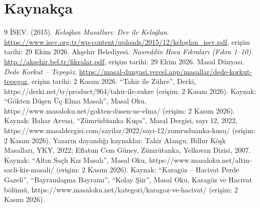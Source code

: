 \documentclass[12pt,a4paper]{article}
\begin{document}
\section{Kaynakça}
\begin{thebibliography}{9}
 İSEV. (2015). \emph{Keloğlan Masalları: Dev ile Keloğlan}. \url{https://www.isev.org.tr/wp-content/uploads/2015/12/keloglan_isev.pdf}, erişim tarihi: 29 Ekim 2026.
 Akşehir Belediyesi. \emph{Nasreddin Hoca Fıkraları (Fıkra 1--10)}. \url{http://aksehir.bel.tr/fikralar.pdf}, erişim tarihi: 29 Ekim 2026.
 Masal Dünyası. \emph{Dede Korkut -- Tepegöz}. \url{https://masal-dunyasi.vercel.app/masallar/dede-korkut-tepegoz}, erişim tarihi: 2 Kasım 2026.
 “Tahir ile Zühre”, Derki, https://derki.net/tr/product/964/tahir-ile-zuhre (erişim: 2 Kasım 2026).
 Kaynak: “Gökten Düşen Üç Elma Masalı”, Masal Oku, https://www.masaloku.net/gokten-dusen-uc-elma/ (erişim: 2 Kasım 2026).
 Kaynak: Bahar Arvasi, “Zümrüdüanka Kuşu”, Masal Dergisi, sayı 12, 2022, https://www.masaldergisi.com/sayilar/2022/sayi-12/zumruduanka-kusu/ (erişim: 2 Kasım 2026). Yazarın dayandığı kaynaklar: Tahir Alangu, Billur Köşk Masalları, YKY, 2022; Eflatun Cem Güney, Zümrütanka, Yelkovan Dizisi, 2007.
Kaynak: “Altın Saçlı Kız Masalı”, Masal Oku, https://www.masaloku.net/altin-sacli-kiz-masali/ (erişim: 2 Kasım 2026).
Kaynak: “Karagöz – Hacivat Perde Gazeli”, “Bayramlaşma Bayramı”, “Kolay Şiir”, Masal Oku, Karagöz ve Hacivat bölümü, https://www.masaloku.net/kategori/karagoz-ve-hacivat/ (erişim: 2 Kasım 2026).
\end{thebibliography}

\appendix
\end{document}
